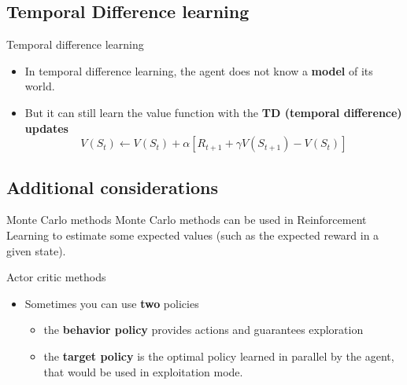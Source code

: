 \documentclass[usenames,dvipsnames,french]{beamer}
\begin{document}
\subsection{Temporal Difference learning}%
\label{sub:temporal_difference_learning}

\begin{frame}{Temporal difference learning}
\begin{itemize}
    \item In temporal difference learning, the agent does not know a
        \textbf{{model}} of its world.
    \item But it can still learn the value function with the \textbf{{TD (temporal difference) updates}} 
    \begin{equation} V(S_t)\leftarrow
V(S_t)+\alpha[R_{t+1}+\gamma V(S_{t+1})-V(S_t)] \label{eq:td0}
    \end{equation}
\end{itemize}
\end{frame}


\subsection{Additional considerations}%
\label{sec:kk}

\begin{frame}{Monte Carlo methods}
    Monte Carlo methods can be used in Reinforcement Learning to estimate
        some expected values (such as the expected reward in a given state).
\end{frame}

%     

%    

\begin{frame}{Actor critic methods}
\begin{itemize}
    \item Sometimes you can use \textbf{{two}} policies
        \begin{itemize}
            \item the \textbf{{behavior policy}} provides actions and guarantees
                exploration
            \item the \textbf{{target policy}} is the optimal policy learned in
                parallel by the agent, that would be used in exploitation mode.
        \end{itemize}
\end{itemize}    
\end{frame}
\end{document}
